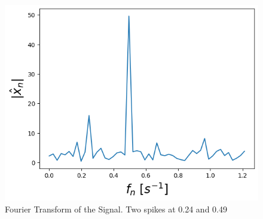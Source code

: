 \documentclass{beamer}
\begin{document}
\begin{frame}
\begin{columns}
			\begin{column}{0.4\textwidth}
				\begin{figure}\label{fig3}
					\begin{center}
						\includegraphics[scale=0.3]{fig2.png}
					\end{center}
				\caption{Fourier Transform of the Signal. Two spikes at 0.24 and 0.49}
				\end{figure}
			\end{column}
		\end{columns}
		
	\end{frame}
\end{document}
